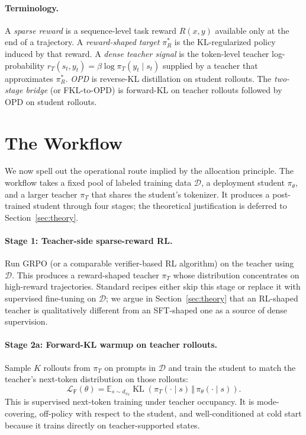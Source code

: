 \documentclass{article}
\begin{document}
\paragraph{Terminology.} A \emph{sparse reward} is a sequence-level task reward $R(x,y)$ available only at the end of a trajectory. A \emph{reward-shaped target} $\pi_R^*$ is the KL-regularized policy induced by that reward. A \emph{dense teacher signal} is the token-level teacher log-probability $r_T(s_t,y_t)=\beta\log\pi_T(y_t\mid s_t)$ supplied by a teacher that approximates $\pi_R^*$. \emph{OPD} is reverse-KL distillation on student rollouts. The \emph{two-stage bridge} (or FKL-to-OPD) is forward-KL on teacher rollouts followed by OPD on student rollouts.

\section{The Workflow}
\label{sec:workflow}

We now spell out the operational route implied by the allocation principle. The workflow takes a fixed pool of labeled training data $\mathcal{D}$, a deployment student $\pi_\theta$, and a larger teacher $\pi_T$ that shares the student's tokenizer. It produces a post-trained student through four stages; the theoretical justification is deferred to Section~\ref{sec:theory}.

\paragraph{Stage 1: Teacher-side sparse-reward RL.} Run GRPO (or a comparable verifier-based RL algorithm) on the teacher using $\mathcal{D}$. This produces a reward-shaped teacher $\pi_T$ whose distribution concentrates on high-reward trajectories. Standard recipes either skip this stage or replace it with supervised fine-tuning on $\mathcal{D}$; we argue in Section~\ref{sec:theory} that an RL-shaped teacher is qualitatively different from an SFT-shaped one as a source of dense supervision.

\paragraph{Stage 2a: Forward-KL warmup on teacher rollouts.} Sample $K$ rollouts from $\pi_T$ on prompts in $\mathcal{D}$ and train the student to match the teacher's next-token distribution on those rollouts:
\[\mathcal{L}_{\mathrm{F}}(\theta) = \mathbb{E}_{s\sim d_{\pi_T}}\operatorname{KL}\!\left(\pi_T(\cdot\mid s)\,\Vert\,\pi_\theta(\cdot\mid s)\right).\]
This is supervised next-token training under teacher occupancy. It is mode-covering, off-policy with respect to the student, and well-conditioned at cold start because it trains directly on teacher-supported states.
\end{document}
